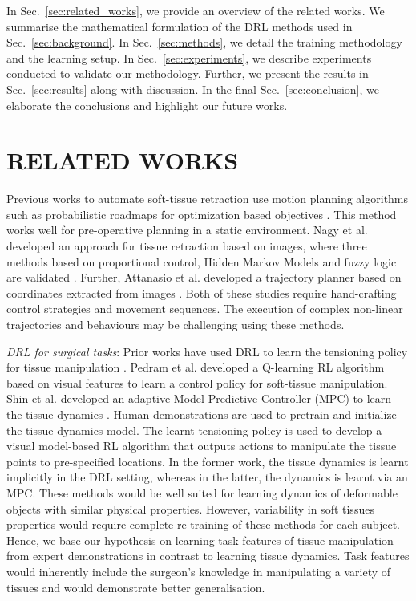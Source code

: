 \documentclass[letterpaper, 10 pt, conference]{ieeeconf}
\begin{document}
In Sec.~\ref{sec:related_works}, we provide an overview of the related works. We summarise the mathematical formulation of the DRL methods used in Sec.~\ref{sec:background}. In Sec.~\ref{sec:methods}, we detail the training methodology and the learning setup. In Sec.~\ref{sec:experiments}, we describe experiments conducted to validate our methodology. Further, we present the results in Sec.~\ref{sec:results} along with discussion. In the final Sec.~\ref{sec:conclusion}, we elaborate the conclusions and highlight our future works. 

\section{RELATED WORKS\label{sec:related_works}}

Previous works to automate soft-tissue retraction use motion planning algorithms such as probabilistic roadmaps for optimization based objectives \cite{patil2010toward}. 
This method works well for pre-operative planning in a static environment. Nagy et al. developed an approach for tissue retraction based on images, where three methods based on proportional control, Hidden Markov Models and fuzzy logic are validated \cite{nagy2018surgical}. Further, Attanasio et al. developed a trajectory planner based on coordinates extracted from images \cite{attanasio2020autonomous}. Both of these studies require hand-crafting control strategies and movement sequences. The execution of complex non-linear trajectories and behaviours may be challenging using these methods.

\textit{DRL for surgical tasks}: Prior works have used DRL to learn the tensioning policy for tissue manipulation \cite{nguyen2019manipulating}. Pedram et al. developed a Q-learning RL algorithm based on visual features to learn a control policy for soft-tissue manipulation.
Shin et al. developed an adaptive Model Predictive Controller (MPC) to learn the tissue dynamics \cite{shin2019autonomous}. Human demonstrations are used to pretrain and initialize the tissue dynamics model. The learnt tensioning policy is used to develop a visual model-based RL algorithm that outputs actions to manipulate the tissue points to pre-specified locations. In the former work, the tissue dynamics is learnt implicitly in the DRL setting, whereas in the latter, the dynamics is learnt via an MPC. These methods would be well suited for learning dynamics of deformable objects with similar physical properties. However, variability in soft tissues properties would require complete re-training of these methods for each subject. Hence, we base our hypothesis on learning task features of tissue manipulation from expert demonstrations in contrast to learning tissue dynamics. Task features would inherently include the surgeon's knowledge in manipulating a variety of tissues and would demonstrate better generalisation.
\end{document}

